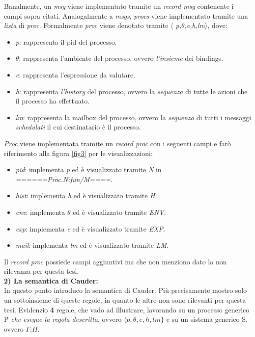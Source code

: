 \documentclass[background.tex]{subfiles}
\begin{document}
Banalmente, un \textit{msg} viene implementato tramite un \textit{record msg} contenente i campi sopra citati.
Analogalmente a \textit{msgs}, \textit{procs} viene implementato tramite una \textit{lista} di \textit{proc}.
Formalmente \textit{proc} viene denotato tramite \textit{$\langle$ p,$\theta$,e,h,lm$\rangle$}, dove:
	\begin{itemize}
		\item \textit{p}: rappresenta il pid del processo.
		\item \textit{$\theta$}: rappresenta l'ambiente del processo, ovvero \textit{l'insieme} dei bindings.
		\item \textit{e}: rappresenta l'espressione da valutare.
		\item \textit{h}: rappresenta \textit{l'history} del processo, ovvero la \textit{sequenza} di tutte le azioni che il processo ha effettuato.
		\item \textit{lm}: rappresenta la mailbox del processo, ovvero la \textit{sequenza} di tutti i messaggi \textit{schedulati} il cui destinatario è il processo.
	\end{itemize}
\textit{Proc} viene implementata tramite un \textit{record proc} con i seguenti campi e farò riferimento alla figura \ref{fig3} per le visualizzazioni:
	\begin{itemize}
		\item \textit{pid}: implementa \textit{p} ed è visualizzato tramite \textit{N} in\\ \textit{======Proc.N:fun/M====}.
		\item \textit{hist}: implementa \textit{h} ed è visualizzato tramite \textit{H}.
		\item \textit{env}: implementa \textit{$\theta$} ed è visualizzato tramite \textit{ENV}.
		\item \textit{exp}: implementa \textit{e} ed è visualizzato tramite \textit{EXP}.
		\item \textit{mail}: implementa \textit{lm} ed è visualizzato tramite \textit{LM}.
	\end{itemize}
	Il \textit{record proc} possiede campi aggiuntivi ma che non menziono dato la non rilevanza per questa tesi.\\
\textbf{2) La semantica di Cauder:}\\
In questo punto introduco la semantica di Cauder. Più precisamente mostro solo un sottoinsieme di queste regole, in quanto le altre non sono rilevanti per questa tesi.
Evidenzio \textbf{4} regole, che vado ad illustrare, lavorando su un processo generico P \textit{che esegue la regola descritta}, ovvero $\displaystyle \langle p,\theta,e,h,lm\}$ e su un sistema generico S, ovvero $\Gamma$;$\Pi$.\\
\end{document}
